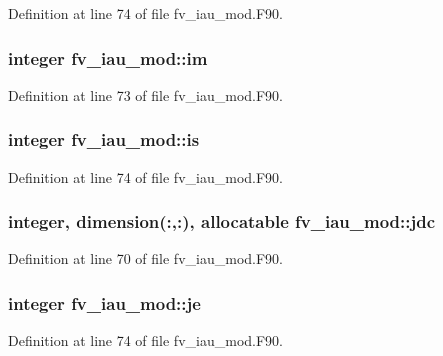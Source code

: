 Definition at line 74 of file fv\-\_\-iau\-\_\-mod.\-F90.

\subsubsection[{im}]{\setlength{\rightskip}{0pt plus 5cm}integer fv\-\_\-iau\-\_\-mod\-::im\hspace{0.3cm}{\ttfamily [private]}}\label{classfv__iau__mod_af1d250bc9006235754621652e834c674}


Definition at line 73 of file fv\-\_\-iau\-\_\-mod.\-F90.

\subsubsection[{is}]{\setlength{\rightskip}{0pt plus 5cm}integer fv\-\_\-iau\-\_\-mod\-::is\hspace{0.3cm}{\ttfamily [private]}}\label{classfv__iau__mod_afb1c5125d4ad50603b747abd8e2cfd66}


Definition at line 74 of file fv\-\_\-iau\-\_\-mod.\-F90.

\subsubsection[{jdc}]{\setlength{\rightskip}{0pt plus 5cm}integer, dimension(\-:,\-:), allocatable fv\-\_\-iau\-\_\-mod\-::jdc\hspace{0.3cm}{\ttfamily [private]}}\label{classfv__iau__mod_a41ed3fc692c4d53ad905c7bb685ef4a0}


Definition at line 70 of file fv\-\_\-iau\-\_\-mod.\-F90.

\subsubsection[{je}]{\setlength{\rightskip}{0pt plus 5cm}integer fv\-\_\-iau\-\_\-mod\-::je\hspace{0.3cm}{\ttfamily [private]}}\label{classfv__iau__mod_a3a77635e7bb49d54f620f47019277693}


Definition at line 74 of file fv\-\_\-iau\-\_\-mod.\-F90.

